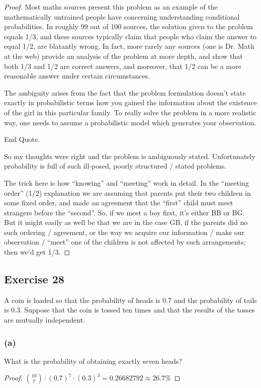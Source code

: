 \documentclass[14pt]{extarticle}
\begin{document}
\begin{proof}
Most maths sources present this problem as an example of the mathematically untrained people have concerning understanding 
conditional probabilities. In roughly 99 out of 100 sources, the solution given to the problem equals 1/3, and these 
sources typically claim that people who claim the answer to equal 1/2, are blatantly wrong. In fact, more rarely any 
sources (one is Dr. Math at the web) provide an analysis of the problem at more depth, and show that both 1/3 and 1/2 are 
correct answers, and moreover, that 1/2 can be a more reasonable answer under certain circumstances. 

The ambiguity arises from the fact that the problem formulation doesn’t state exactly in probabilistic terms how 
you gained the information about the existence of the girl in this particular family. To really solve the problem in a more 
realistic way, one needs to assume a probabilistic model which generates your observation.

End Quote.

So my thoughts were right and the problem is ambiguously stated. Unfortunately probability is full of such ill-posed,
poorly structured / stated problems. 

The trick here is how ``knowing'' and ``meeting'' work in detail. In the ``meeting order'' (1/2) explanation we are 
assuming that parents put their two children in some fixed order, and made an agreement that the ``first'' child must 
meet strangers before the ``second''. So, if we meet a boy first, it's either BB or BG. But it might easily as well be 
that we are in the case GB, if the parents did no such ordering / agreement, or the way we acquire our information / 
make our observation / ``meet'' one of the children is not affected by such arrangements; then we'd get 1/3.
\end{proof}

\subsection{Exercise 28}
A coin is loaded so that the probability of heads is 0.7 and the probability of tails is 0.3. Suppose that the coin is 
tossed ten times and that the results of the tosses are mutually independent.

\subsubsection{(a)}
What is the probability of obtaining exactly seven heads?
\begin{proof}
\(\binom{10}{7} \cdot (0.7)^7 \cdot (0.3)^3 = 0.26682792 \approx 26.7\%\)
\end{proof}
\end{document}
